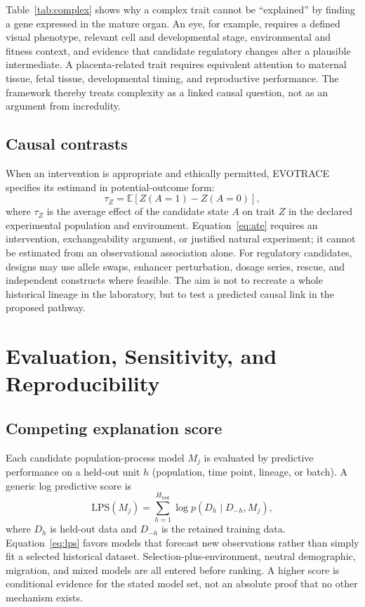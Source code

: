 \documentclass[conference]{IEEEtran}
\begin{document}
Table~\ref{tab:complex} shows why a complex trait cannot be ``explained'' by finding a gene expressed in the mature organ. An eye, for example, requires a defined visual phenotype, relevant cell and developmental stage, environmental and fitness context, and evidence that candidate regulatory changes alter a plausible intermediate. A placenta-related trait requires equivalent attention to maternal tissue, fetal tissue, developmental timing, and reproductive performance. The framework thereby treats complexity as a linked causal question, not as an argument from incredulity.

\subsection{Causal contrasts}

When an intervention is appropriate and ethically permitted, EVOTRACE specifies its estimand in potential-outcome form:
\begin{equation}
\tau_Z=\mathbb{E}\left[Z\left(A=1\right)-Z\left(A=0\right)\right],
\label{eq:ate}
\end{equation}
where $\tau_Z$ is the average effect of the candidate state $A$ on trait $Z$ in the declared experimental population and environment. Equation~\eqref{eq:ate} requires an intervention, exchangeability argument, or justified natural experiment; it cannot be estimated from an observational association alone. For regulatory candidates, designs may use allele swaps, enhancer perturbation, dosage series, rescue, and independent constructs where feasible. The aim is not to recreate a whole historical lineage in the laboratory, but to test a predicted causal link in the proposed pathway.

\section{Evaluation, Sensitivity, and Reproducibility}

\subsection{Competing explanation score}

Each candidate population-process model $M_j$ is evaluated by predictive performance on a held-out unit $h$ (population, time point, lineage, or batch). A generic log predictive score is
\begin{equation}
\mathrm{LPS}(M_j)=\sum_{h=1}^{H_{\mathrm{test}}}\log p\left(D_h\mid D_{-h},M_j\right),
\label{eq:lps}
\end{equation}
where $D_h$ is held-out data and $D_{-h}$ is the retained training data. Equation~\eqref{eq:lps} favors models that forecast new observations rather than simply fit a selected historical dataset. Selection-plus-environment, neutral demographic, migration, and mixed models are all entered before ranking. A higher score is conditional evidence for the stated model set, not an absolute proof that no other mechanism exists.
\end{document}
